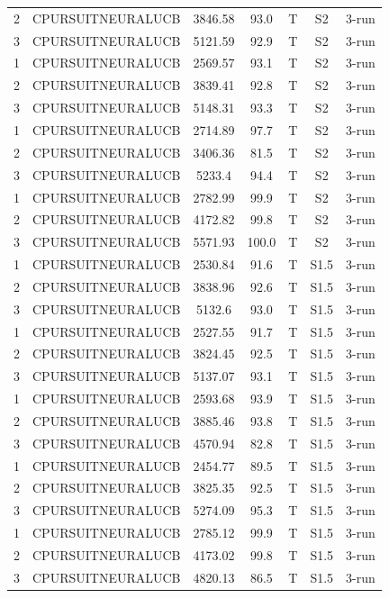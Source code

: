 \documentclass[11pt]{article}
\begin{document}
\begin{center}
\begin{longtable}{|c|c|c|c|c|c|c|}
2 & CPURSUITNEURALUCB & 3846.58 & 93.0 & T & S2 & 3-run \\
3 & CPURSUITNEURALUCB & 5121.59 & 92.9 & T & S2 & 3-run \\
1 & CPURSUITNEURALUCB & 2569.57 & 93.1 & T & S2 & 3-run \\
2 & CPURSUITNEURALUCB & 3839.41 & 92.8 & T & S2 & 3-run \\
3 & CPURSUITNEURALUCB & 5148.31 & 93.3 & T & S2 & 3-run \\
1 & CPURSUITNEURALUCB & 2714.89 & 97.7 & T & S2 & 3-run \\
2 & CPURSUITNEURALUCB & 3406.36 & 81.5 & T & S2 & 3-run \\
3 & CPURSUITNEURALUCB & 5233.4 & 94.4 & T & S2 & 3-run \\
1 & CPURSUITNEURALUCB & 2782.99 & 99.9 & T & S2 & 3-run \\
2 & CPURSUITNEURALUCB & 4172.82 & 99.8 & T & S2 & 3-run \\
3 & CPURSUITNEURALUCB & 5571.93 & 100.0 & T & S2 & 3-run \\
1 & CPURSUITNEURALUCB & 2530.84 & 91.6 & T & S1.5 & 3-run \\
2 & CPURSUITNEURALUCB & 3838.96 & 92.6 & T & S1.5 & 3-run \\
3 & CPURSUITNEURALUCB & 5132.6 & 93.0 & T & S1.5 & 3-run \\
1 & CPURSUITNEURALUCB & 2527.55 & 91.7 & T & S1.5 & 3-run \\
2 & CPURSUITNEURALUCB & 3824.45 & 92.5 & T & S1.5 & 3-run \\
3 & CPURSUITNEURALUCB & 5137.07 & 93.1 & T & S1.5 & 3-run \\
1 & CPURSUITNEURALUCB & 2593.68 & 93.9 & T & S1.5 & 3-run \\
2 & CPURSUITNEURALUCB & 3885.46 & 93.8 & T & S1.5 & 3-run \\
3 & CPURSUITNEURALUCB & 4570.94 & 82.8 & T & S1.5 & 3-run \\
1 & CPURSUITNEURALUCB & 2454.77 & 89.5 & T & S1.5 & 3-run \\
2 & CPURSUITNEURALUCB & 3825.35 & 92.5 & T & S1.5 & 3-run \\
3 & CPURSUITNEURALUCB & 5274.09 & 95.3 & T & S1.5 & 3-run \\
1 & CPURSUITNEURALUCB & 2785.12 & 99.9 & T & S1.5 & 3-run \\
2 & CPURSUITNEURALUCB & 4173.02 & 99.8 & T & S1.5 & 3-run \\
3 & CPURSUITNEURALUCB & 4820.13 & 86.5 & T & S1.5 & 3-run \\

\end{longtable}
\end{center}
\end{document}
